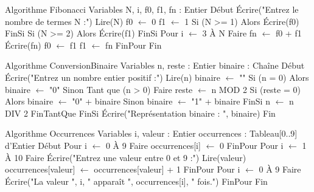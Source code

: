 \begin{algo}
Algorithme Fibonacci
Variables
    N, i, f0, f1, fn : Entier
Début
    Écrire("Entrez le nombre de termes N :")
    Lire(N)
    f0 $\leftarrow$ 0
    f1 $\leftarrow$ 1
    Si (N >= 1) Alors
        Écrire(f0)
    FinSi
    Si (N >= 2) Alors
        Écrire(f1)
    FinSi
    Pour i $\leftarrow$ 3 À N Faire
        fn $\leftarrow$ f0 + f1
        Écrire(fn)
        f0 $\leftarrow$ f1
        f1 $\leftarrow$ fn
    FinPour
Fin
\end{algo}

\begin{algo}
Algorithme ConversionBinaire
Variables
    n, reste : Entier
    binaire : Chaîne
Début
    Écrire("Entrez un nombre entier positif :")
    Lire(n)
    binaire $\leftarrow$ ""
    Si (n = 0) Alors
        binaire $\leftarrow$ "0"
    Sinon
        Tant que (n > 0) Faire
            reste $\leftarrow$ n MOD 2
            Si (reste = 0) Alors
                binaire $\leftarrow$ "0" + binaire
            Sinon
                binaire $\leftarrow$ "1" + binaire
            FinSi
            n $\leftarrow$ n DIV 2
        FinTantQue
    FinSi
    Écrire("Représentation binaire : ", binaire)
Fin
\end{algo}

\begin{algo}
Algorithme Occurrences
Variables
    i, valeur : Entier
    occurrences : Tableau[0..9] d'Entier
Début
    Pour i $\leftarrow$ 0 À 9 Faire
        occurrences[i] $\leftarrow$ 0
    FinPour
    Pour i $\leftarrow$ 1 À 10 Faire
        Écrire("Entrez une valeur entre 0 et 9 :")
        Lire(valeur)
        occurrences[valeur] $\leftarrow$ occurrences[valeur] + 1
    FinPour
    Pour i $\leftarrow$ 0 À 9 Faire
        Écrire("La valeur ", i, " apparaît ", occurrences[i], " fois.")
    FinPour
Fin
\end{algo}